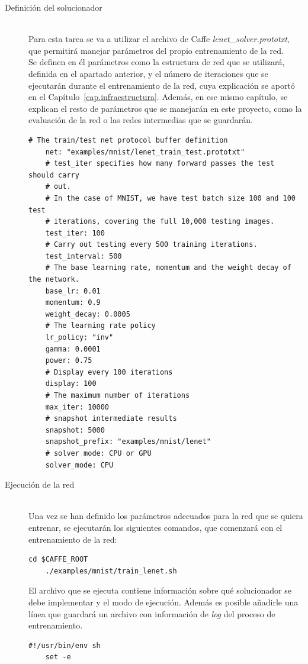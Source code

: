 \begin{description}
	\vspace{50pt}
	\item[Definición del solucionador] \hfill 
	\vspace{10pt}
	\\
	Para esta tarea se va a utilizar el archivo de Caffe \textit{lenet\_solver.prototxt}, que permitirá manejar parámetros del propio entrenamiento de la red.\\ 
	Se definen en él parámetros como la estructura de red que se utilizará, definida en el apartado anterior, y el número de iteraciones que se ejecutarán durante el entrenamiento de la red, cuya explicación se aportó en el Capítulo~\ref{cap.infraestructura}. Además, en ese mismo capítulo, se explican el resto de parámetros que se manejarán en este proyecto, como la evaluación de la red o las redes intermedias que se guardarán.
	\vspace{5pt}
	\begin{lstlisting}[frame=single]
	# The train/test net protocol buffer definition
	net: "examples/mnist/lenet_train_test.prototxt"
	# test_iter specifies how many forward passes the test should carry 
	# out.
	# In the case of MNIST, we have test batch size 100 and 100 test
	# iterations, covering the full 10,000 testing images.
	test_iter: 100
	# Carry out testing every 500 training iterations.
	test_interval: 500
	# The base learning rate, momentum and the weight decay of the network.
	base_lr: 0.01
	momentum: 0.9
	weight_decay: 0.0005
	# The learning rate policy
	lr_policy: "inv"
	gamma: 0.0001
	power: 0.75
	# Display every 100 iterations
	display: 100
	# The maximum number of iterations
	max_iter: 10000
	# snapshot intermediate results
	snapshot: 5000
	snapshot_prefix: "examples/mnist/lenet"
	# solver mode: CPU or GPU
	solver_mode: CPU	
	\end{lstlisting}
	\vspace{15pt}
	\item[Ejecución de la red] \hfill 
	\vspace{10pt}
	\\
	Una vez se han definido los parámetros adecuados para la red que se quiera entrenar, se ejecutarán los siguientes comandos, que comenzará con el entrenamiento de la red:
	\vspace{10pt}
	\begin{lstlisting}[frame=single]
	cd $CAFFE_ROOT
	./examples/mnist/train_lenet.sh	
	\end{lstlisting}
	
	El archivo que se ejecuta contiene información sobre qué solucionador se debe implementar y el modo de ejecución. Además es posible añadirle una línea que guardará un archivo con información de \textit{log} del proceso de entrenamiento.
	\vspace{10pt}
	\begin{lstlisting}[frame=single]
	#!/usr/bin/env sh
	set -e
	

\end{lstlisting}
\end{description}
